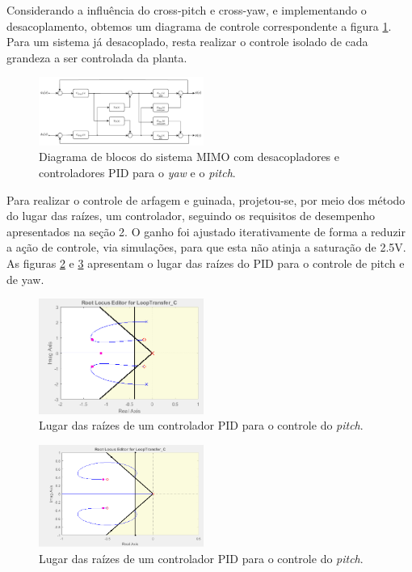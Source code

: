 Considerando a influência do cross-pitch e cross-yaw, e implementando o desacoplamento, obtemos um diagrama de controle correspondente a figura \ref{fig:ControleMIMOPID}. Para um sistema já desacoplado, resta realizar o controle isolado de cada grandeza a ser controlada da planta.

\begin{figure}[H]
    \centering
    \includegraphics[width=0.48\textwidth]{figures/Controle/Controle_PID_Desacoplado.pdf}
    \caption{Diagrama de blocos do sistema MIMO com desacopladores e controladores PID para o \textit{yaw} e o \textit{pitch}.}
    \label{fig:ControleMIMOPID}
\end{figure}


Para realizar o controle de arfagem e guinada, projetou-se, por meio dos método do lugar das raízes, um controlador, seguindo os requisitos de desempenho apresentados na seção 2. O ganho foi ajustado iterativamente de forma a reduzir a ação de controle, via simulações, para que esta não atinja a saturação de 2.5V.
As figuras \ref{fig:rLocusPitch} e  \ref{fig:rLocusYaw} apresentam o lugar das raízes do PID para o controle de pitch e de yaw.

\begin{figure}[H]
    \centering
    \includegraphics[width=0.48\textwidth]{figures/rlocus_MF.PNG}
    \caption{Lugar das raízes de um controlador PID para o controle do  \textit{pitch}.}
    \label{fig:rLocusPitch}
\end{figure}

\begin{figure}[H]
    \centering
    \includegraphics[width=0.48\textwidth]{figures/controlador_yaw_root_locus.PNG}
    \caption{Lugar das raízes de um controlador PID para o controle do  \textit{pitch}.}
    \label{fig:rLocusYaw}
\end{figure}


